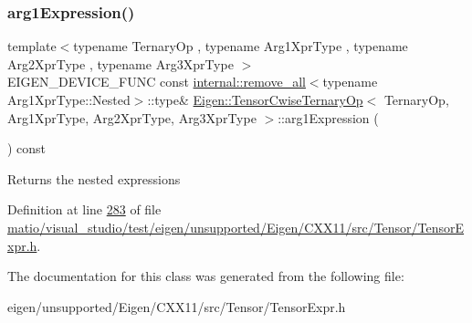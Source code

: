 \subsubsection{\texorpdfstring{arg1\+Expression()}{arg1Expression()}\hspace{0.1cm}{\footnotesize\ttfamily [2/2]}}
{\footnotesize\ttfamily template$<$typename Ternary\+Op , typename Arg1\+Xpr\+Type , typename Arg2\+Xpr\+Type , typename Arg3\+Xpr\+Type $>$ \\
E\+I\+G\+E\+N\+\_\+\+D\+E\+V\+I\+C\+E\+\_\+\+F\+U\+NC const \hyperlink{struct_eigen_1_1internal_1_1remove__all}{internal\+::remove\+\_\+all}$<$typename Arg1\+Xpr\+Type\+::\+Nested$>$\+::type\& \hyperlink{class_eigen_1_1_tensor_cwise_ternary_op}{Eigen\+::\+Tensor\+Cwise\+Ternary\+Op}$<$ Ternary\+Op, Arg1\+Xpr\+Type, Arg2\+Xpr\+Type, Arg3\+Xpr\+Type $>$\+::arg1\+Expression (\begin{DoxyParamCaption}{ }\end{DoxyParamCaption}) const\hspace{0.3cm}{\ttfamily [inline]}}

\begin{DoxyReturn}{Returns}
the nested expressions 
\end{DoxyReturn}


Definition at line \hyperlink{matio_2visual__studio_2test_2eigen_2unsupported_2_eigen_2_c_x_x11_2src_2_tensor_2_tensor_expr_8h_source_l00283}{283} of file \hyperlink{matio_2visual__studio_2test_2eigen_2unsupported_2_eigen_2_c_x_x11_2src_2_tensor_2_tensor_expr_8h_source}{matio/visual\+\_\+studio/test/eigen/unsupported/\+Eigen/\+C\+X\+X11/src/\+Tensor/\+Tensor\+Expr.\+h}.



The documentation for this class was generated from the following file\+:\begin{DoxyCompactItemize}
\item 
eigen/unsupported/\+Eigen/\+C\+X\+X11/src/\+Tensor/\+Tensor\+Expr.\+h\end{DoxyCompactItemize}
